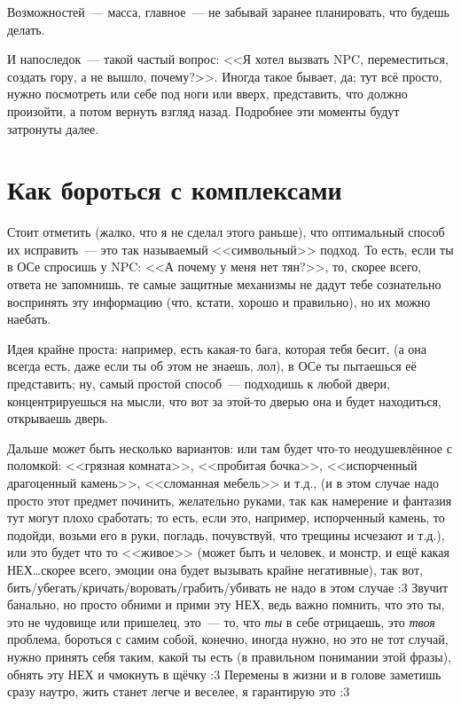 \documentclass[a5paper,12pt,twoside]{memoir}
\begin{document}
Возможностей~--- масса, главное~--- не забывай заранее планировать, что будешь делать.

И напоследок~--- такой частый вопрос: <<Я хотел вызвать NPC, переместиться, создать гору, а не вышло, почему?>>. Иногда такое бывает, да; тут всё просто, нужно посмотреть или себе под ноги или вверх, представить, что должно произойти, а потом вернуть взгляд назад. Подробнее эти моменты будут затронуты далее.

\section{Как бороться с комплексами}
Стоит отметить (жалко, что я не сделал этого раньше), что оптимальный способ их исправить~--- это так называемый <<символьный>> подход. То есть, если ты в ОСе спросишь у NPC: <<А почему у меня нет тян?>>, то, скорее всего, ответа не запомнишь, те самые защитные механизмы не дадут тебе сознательно воспринять эту информацию (что, кстати, хорошо и правильно), но их можно наебать. 

Идея крайне проста: например, есть какая-то бага, которая тебя бесит, (а она всегда есть, даже если ты об этом не знаешь, лол), в ОСе ты пытаешься её представить; ну, самый простой способ~--- подходишь к любой двери, концентрируешься на мысли, что вот за этой-то дверью она и будет находиться, открываешь дверь. 

Дальше может быть несколько вариантов: или там будет что-то неодушевлённое с поломкой: <<грязная комната>>, <<пробитая бочка>>, <<испорченный драгоценный камень>>, <<сломанная мебель>> и т.д., (и в этом случае надо просто этот предмет починить, желательно руками, так как намерение и фантазия тут могут плохо сработать; то есть, если это, например, испорченный камень, то подойди, возьми его в руки, погладь, почувствуй, что трещины исчезают и т.д.), или это будет что то <<живое>> (может быть и человек, и монстр, и ещё какая НЕХ\ldots скорее всего, эмоции она будет вызывать крайне негативные), так вот, бить/убегать/кричать/воровать/грабить/убивать не надо в этом случае :3 Звучит банально, но просто обними и прими эту НЕХ, ведь важно помнить, что это ты, это не чудовище или пришелец, это~--- то, что \textit{ты} в себе отрицаешь, это \textit{твоя} проблема, бороться с самим собой, конечно, иногда нужно, но это не тот случай, нужно принять себя таким, какой ты есть (в правильном понимании этой фразы), обнять эту НЕХ и чмокнуть в щёчку :3 Перемены в жизни и в голове заметишь сразу наутро, жить станет легче и веселее, я гарантирую это :3
 
\end{document}
